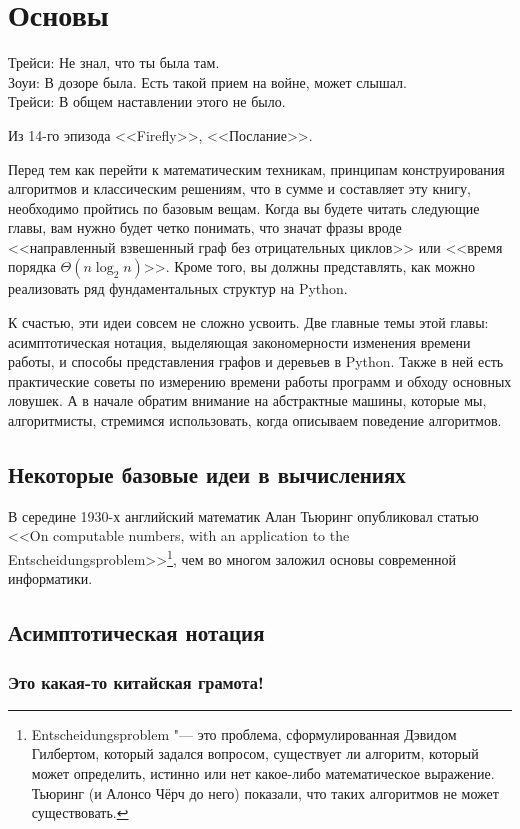 \chapter{Основы}
\label{chap:basics}

\epigraph{Трейси: Не знал, что ты была там.\\
Зоуи: В дозоре была. Есть такой прием на войне, может слышал.\\
Трейси: В общем наставлении этого не было.
}{Из 14-го эпизода <<Firefly>>, <<Послание>>.}


Перед тем как перейти к математическим техникам, принципам конструирования алгоритмов и классическим решениям, что в сумме и составляет эту книгу, необходимо пройтись по базовым вещам. Когда вы будете читать следующие главы, вам нужно будет четко понимать, что значат фразы вроде <<направленный взвешенный граф без отрицательных циклов>> или <<время порядка $\Theta(n \log_2n)$>>. Кроме того, вы должны представлять, как можно реализовать ряд фундаментальных структур на Python.

К счастью, эти идеи совсем не сложно усвоить. Две главные темы этой главы: асимптотическая нотация, выделяющая закономерности изменения времени работы, и способы представления графов и деревьев в Python. Также в ней есть практические советы по измерению времени работы программ и обходу основных ловушек. А в начале обратим внимание на абстрактные машины, которые мы, алгоритмисты, стремимся использовать, когда описываем поведение алгоритмов.

\section{Некоторые базовые идеи в вычислениях}

В середине 1930-х английский математик Алан Тьюринг опубликовал статью <<On computable numbers, with an application to the Entscheidungsproblem>>\footnote{Entscheidungsproblem "--- это проблема, сформулированная Дэвидом Гилбертом, который задался вопросом, существует ли алгоритм, который может определить, истинно или нет какое-либо математическое выражение. Тьюринг (и Алонсо Чёрч до него) показали, что таких алгоритмов не может существовать.}, чем во многом заложил основы современной информатики.


\section{Асимптотическая нотация}
\subsection{Это какая-то китайская грамота!}
